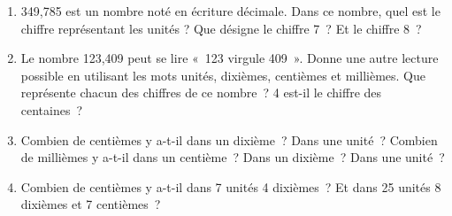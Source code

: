 \begin{activite}
\begin{enumerate}
 \item 349,785 est un nombre noté en écriture décimale. Dans ce nombre, quel est le chiffre représentant les unités ? Que désigne le chiffre 7 ? Et le chiffre 8 ?
 \item Le nombre 123,409 peut se lire « 123 virgule 409 ». Donne une autre lecture possible en utilisant les mots unités, dixièmes, centièmes et millièmes.
Que représente chacun des chiffres de ce nombre ? 4 est-il le chiffre des centaines ?
 \item Combien de centièmes y a-t-il dans un  dixième ? Dans une  unité ?
Combien de millièmes y a-t-il dans un centième ? Dans un dixième ? Dans une unité ?
 \item Combien de centièmes y a-t-il dans 7 unités 4 dixièmes ? Et dans 25 unités 8 dixièmes et 7 centièmes ?
 \end{enumerate}
\end{activite}




